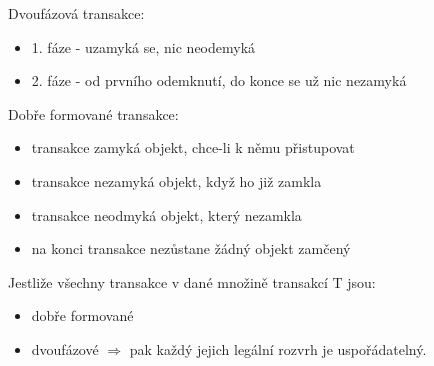 \documentclass{szzclass}
\begin{document}
Dvoufázová transakce:
\begin{itemize}
\item 1. fáze - uzamyká se, nic neodemyká
\item 2. fáze - od prvního odemknutí, do konce se už nic nezamyká
\end{itemize}

Dobře formované transakce:
\begin{itemize}
\item transakce zamyká objekt, chce-li k němu přistupovat
\item transakce nezamyká objekt, když ho již zamkla 
\item transakce neodmyká objekt, který nezamkla
\item na konci transakce nezůstane žádný objekt zamčený
\end{itemize}

Jestliže všechny transakce v dané množině transakcí T jsou:
\begin{itemize}
\item dobře formované 
\item dvoufázové $\Rightarrow$ pak každý jejich legální rozvrh je uspořádatelný.
\end{itemize}
\end{document}
